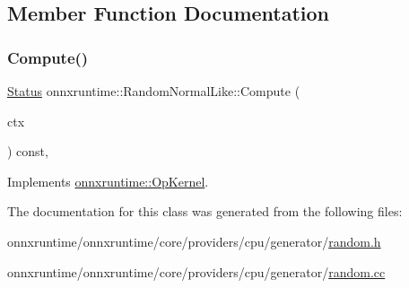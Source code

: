 \subsection{Member Function Documentation}
\mbox{\label{classonnxruntime_1_1RandomNormalLike_a68db6b9ed1cad3eba8c18e11b8397138}} 
\subsubsection{\texorpdfstring{Compute()}{Compute()}}
{\footnotesize\ttfamily \mbox{\hyperlink{classonnxruntime_1_1common_1_1Status}{Status}} onnxruntime\+::\+Random\+Normal\+Like\+::\+Compute (\begin{DoxyParamCaption}\item[{\mbox{\hyperlink{classonnxruntime_1_1OpKernelContext}{Op\+Kernel\+Context}} $\ast$}]{ctx }\end{DoxyParamCaption}) const\hspace{0.3cm}{\ttfamily [override]}, {\ttfamily [virtual]}}



Implements \mbox{\hyperlink{classonnxruntime_1_1OpKernel_a9eca8656a78b1b3ab9d3351a12798650}{onnxruntime\+::\+Op\+Kernel}}.



The documentation for this class was generated from the following files\+:\begin{DoxyCompactItemize}
\item 
onnxruntime/onnxruntime/core/providers/cpu/generator/\mbox{\hyperlink{random_8h}{random.\+h}}\item 
onnxruntime/onnxruntime/core/providers/cpu/generator/\mbox{\hyperlink{random_8cc}{random.\+cc}}\end{DoxyCompactItemize}
